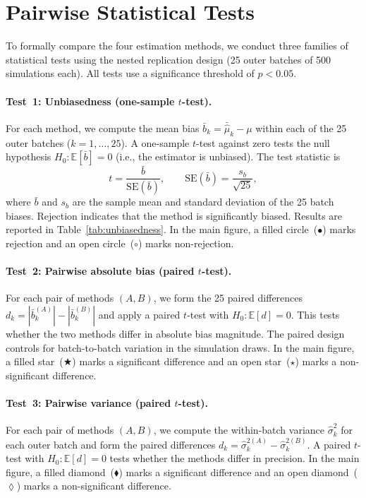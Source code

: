 \documentclass[11pt]{article}
\begin{document}
\section{Pairwise Statistical Tests}
\label{sec:pairwise_tests}

To formally compare the four estimation methods, we conduct three families of statistical tests using the nested replication design (25 outer batches of 500 simulations each). All tests use a significance threshold of $p < 0.05$.

\paragraph{Test~1: Unbiasedness (one-sample $t$-test).}
For each method, we compute the mean bias $\bar{b}_k = \bar{\hat{\mu}}_k - \mu$ within each of the 25 outer batches ($k = 1, \dots, 25$). A one-sample $t$-test against zero tests the null hypothesis $H_0\colon \mathbb{E}[\bar{b}] = 0$ (i.e., the estimator is unbiased). The test statistic is
\[
t = \frac{\bar{b}}{\mathrm{SE}(\bar{b})}, \qquad \mathrm{SE}(\bar{b}) = \frac{s_b}{\sqrt{25}},
\]
where $\bar{b}$ and $s_b$ are the sample mean and standard deviation of the 25 batch biases. Rejection indicates that the method is significantly biased. Results are reported in Table~\ref{tab:unbiasedness}. In the main figure, a filled circle~($\bullet$) marks rejection and an open circle~($\circ$) marks non-rejection.

\paragraph{Test~2: Pairwise absolute bias (paired $t$-test).}
For each pair of methods $(A, B)$, we form the 25 paired differences $d_k = |\bar{b}_k^{(A)}| - |\bar{b}_k^{(B)}|$ and apply a paired $t$-test with $H_0\colon \mathbb{E}[d] = 0$. This tests whether the two methods differ in absolute bias magnitude. The paired design controls for batch-to-batch variation in the simulation draws. In the main figure, a filled star~($\bigstar$) marks a significant difference and an open star~($\star$) marks a non-significant difference.

\paragraph{Test~3: Pairwise variance (paired $t$-test).}
For each pair of methods $(A, B)$, we compute the within-batch variance $\hat{\sigma}^2_k$ for each outer batch and form the paired differences $d_k = \hat{\sigma}^{2(A)}_k - \hat{\sigma}^{2(B)}_k$. A paired $t$-test with $H_0\colon \mathbb{E}[d] = 0$ tests whether the methods differ in precision. In the main figure, a filled diamond~($\blacklozenge$) marks a significant difference and an open diamond~($\lozenge$) marks a non-significant difference.
\end{document}
